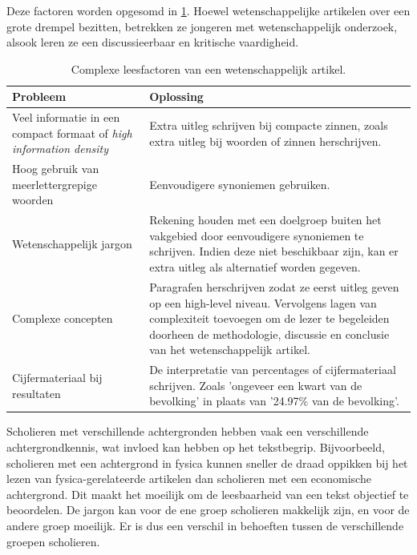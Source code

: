 \medspace

Deze factoren worden opgesomd in \ref{table:scientific-paper-struggles}. Hoewel wetenschappelijke artikelen over een grote drempel bezitten, betrekken ze jongeren met wetenschappelijk onderzoek, alsook leren ze een discussieerbaar en kritische vaardigheid. 

\medspace

\begin{center}
	\begin{table}[H]
	\begin{tabular}{| m{4cm} | m{10cm} |}
		\hline
		\textbf{Probleem} & \textbf{Oplossing} \\
		\hline
		Veel informatie in een compact formaat of \textit{high information density} & Extra uitleg schrijven bij compacte zinnen, zoals extra uitleg bij woorden of zinnen herschrijven. \\
		\hline
		Hoog gebruik van meerlettergrepige woorden & Eenvoudigere synoniemen gebruiken. \\
		\hline
		Wetenschappelijk jargon & Rekening houden met een doelgroep buiten het vakgebied door eenvoudigere synoniemen te schrijven. Indien deze niet beschikbaar zijn, kan er extra uitleg als alternatief worden gegeven. \\
		\hline
		Complexe concepten & Paragrafen herschrijven zodat ze eerst uitleg geven op een high-level niveau. Vervolgens lagen van complexiteit toevoegen om de lezer te begeleiden doorheen de methodologie, discussie en conclusie van het wetenschappelijk artikel. \\ 
		\hline
		Cijfermateriaal bij resultaten & De interpretatie van percentages of cijfermateriaal schrijven. Zoals 'ongeveer een kwart van de bevolking' in plaats van '24.97\% van de bevolking'. \\
		\hline
	\end{tabular}
	\caption{Complexe leesfactoren van een wetenschappelijk artikel.}
	\label{table:scientific-paper-struggles}
	\end{table}
\end{center}

Scholieren met verschillende achtergronden hebben vaak een verschillende achtergrondkennis, wat invloed kan hebben op het tekstbegrip. Bijvoorbeeld, scholieren met een achtergrond in fysica kunnen sneller de draad oppikken bij het lezen van fysica-gerelateerde artikelen dan scholieren met een economische achtergrond. Dit maakt het moeilijk om de leesbaarheid van een tekst objectief te beoordelen. De jargon kan voor de ene groep scholieren makkelijk zijn, en voor de andere groep moeilijk. Er is dus een verschil in behoeften tussen de verschillende groepen scholieren.

